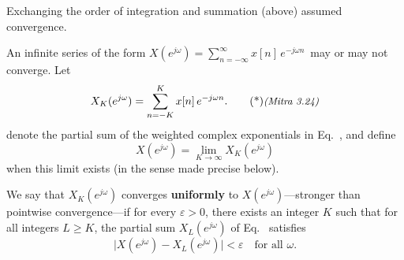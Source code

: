 \documentclass[handout_subfiles_root.tex]{subfiles}
\begin{document}
\label{sec:dtft-convergence}

\begin{notebox}
Exchanging the order of integration and summation (above) assumed convergence.
\end{notebox}

\begin{defbox}[title={Convergence}]
An infinite series of the form $X(e^{j\omega}) = \sum_{n=-\infty}^{\infty} x[n]\,e^{-j\omega n}$\, may or may not converge. Let
\begin{equation}
X_K(e^{j\omega}) = \sum_{n=-K}^{K} x[n]\,e^{-j\omega n}.\MitraTagRef{3.24}
\end{equation}
denote the partial sum of the weighted complex exponentials in Eq.~, and define
\begin{equation}
X(e^{j\omega}) = \lim_{K\to\infty} X_K(e^{j\omega})
\end{equation}
when this limit exists (in the sense made precise below).
\end{defbox}

\begin{defbox}[title={Def}]
We say that $X_K(e^{j\omega})$ converges \textbf{uniformly} to $X(e^{j\omega})$---stronger than pointwise convergence---if for every $\varepsilon>0$, there exists an integer $K$ such that for all integers $L\ge K$, the partial sum $X_L(e^{j\omega})$ of Eq.~ satisfies
\begin{equation}
\big|X(e^{j\omega}) - X_L(e^{j\omega})\big| < \varepsilon \quad \text{for all } \omega.
\end{equation}
\end{defbox}
\end{document}
